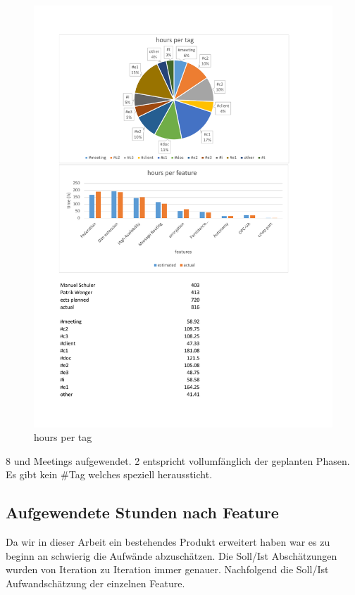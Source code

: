 \begin{figure}[]
	\includegraphics[trim=4cm 18.8cm 3.5cm 2.8cm, clip=true, width=\textwidth]{img/project_monitoring_diagrams.pdf}
	\caption{hours per tag}
	\label{fig:hours:per:tag}
\end{figure}

8%
und Meetings aufgewendet. 2%
entspricht vollumfänglich der geplanten Phasen. Es gibt kein \#Tag welches speziell heraussticht. 


\subsection{Aufgewendete Stunden nach Feature}
Da wir in dieser Arbeit ein bestehendes Produkt erweitert haben war es zu beginn an
schwierig die Aufwände abzuschätzen. Die Soll/Ist Abschätzungen wurden von Iteration zu Iteration
immer genauer. Nachfolgend die Soll/Ist Aufwandschätzung der einzelnen Feature.

